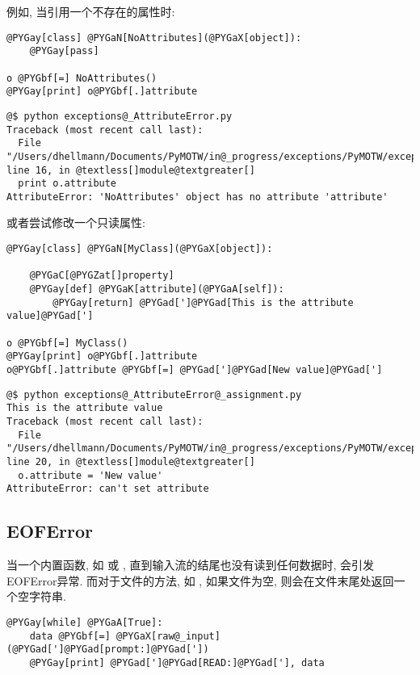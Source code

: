 \documentclass[a4paper,10pt,english]{manual}
\begin{document}
例如, 当引用一个不存在的属性时:

\begin{Verbatim}[commandchars=@\[\]]
@PYGay[class] @PYGaN[NoAttributes](@PYGaX[object]):
    @PYGay[pass]

o @PYGbf[=] NoAttributes()
@PYGay[print] o@PYGbf[.]attribute
\end{Verbatim}

\begin{Verbatim}[commandchars=@\[\]]
@$ python exceptions@_AttributeError.py
Traceback (most recent call last):
  File "/Users/dhellmann/Documents/PyMOTW/in@_progress/exceptions/PyMOTW/exceptions/exceptions@_AttributeError.py", line 16, in @textless[]module@textgreater[]
  print o.attribute
AttributeError: 'NoAttributes' object has no attribute 'attribute'
\end{Verbatim}

或者尝试修改一个只读属性:

\begin{Verbatim}[commandchars=@\[\]]
@PYGay[class] @PYGaN[MyClass](@PYGaX[object]):

    @PYGaC[@PYGZat[]property]
    @PYGay[def] @PYGaK[attribute](@PYGaA[self]):
        @PYGay[return] @PYGad[']@PYGad[This is the attribute value]@PYGad[']

o @PYGbf[=] MyClass()
@PYGay[print] o@PYGbf[.]attribute
o@PYGbf[.]attribute @PYGbf[=] @PYGad[']@PYGad[New value]@PYGad[']
\end{Verbatim}

\begin{Verbatim}[commandchars=@\[\]]
@$ python exceptions@_AttributeError@_assignment.py
This is the attribute value
Traceback (most recent call last):
  File "/Users/dhellmann/Documents/PyMOTW/in@_progress/exceptions/PyMOTW/exceptions/exceptions@_AttributeError@_assignment.py", line 20, in @textless[]module@textgreater[]
  o.attribute = 'New value'
AttributeError: can't set attribute
\end{Verbatim}


\subsection{EOFError}

当一个内置函数, 如  或 , 直到输入流的结尾也没有读到任何数据时, 会引发EOFError异常. 而对于文件的方法, 如 , 如果文件为空, 则会在文件末尾处返回一个空字符串.

\begin{Verbatim}[commandchars=@\[\]]
@PYGay[while] @PYGaA[True]:
    data @PYGbf[=] @PYGaX[raw@_input](@PYGad[']@PYGad[prompt:]@PYGad['])
    @PYGay[print] @PYGad[']@PYGad[READ:]@PYGad['], data
\end{Verbatim}
\end{document}
